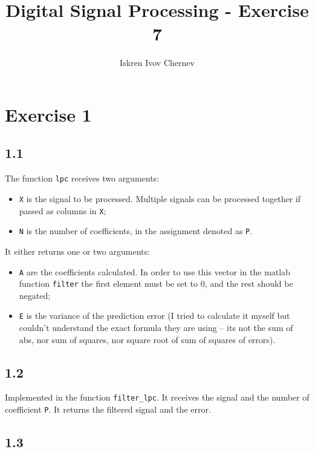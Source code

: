 \documentclass[a4paper]{article}
\newcommand{\TT}[1] {\texttt{#1}}
\begin{document}
\title{Digital Signal Processing - Exercise 7}
\author{Iskren Ivov Chernev}
\maketitle

\section*{Exercise 1}

\subsection*{1.1}

The function \TT{lpc} receives two arguments:
\begin{itemize}
  \item \TT{X} is the signal to be processed. Multiple signals can be processed
        together if passed as columns in \TT{X}; \\
  \item \TT{N} is the number of coefficients, in the assignment denoted as \TT{P}. \\
\end{itemize}

It either returns one or two arguments:
\begin{itemize}
  \item \TT{A} are the coefficients calculated. In order to use this vector in
  the matlab function \TT{filter} the first element must be set to $ 0 $, and
  the rest should be negated; \\
  \item \TT{E} is the variance of the prediction error (I tried to calculate it
  myself but couldn't understand the exact formula they are using -- its not
  the sum of abs, nor sum of squares, nor square root of sum of squares of
  errors). \\
\end{itemize}

\subsection*{1.2}

Implemented in the function \TT{filter\_lpc}. It receives the signal and the
number of coefficient \TT{P}. It returns the filtered signal and the error.

\subsection*{1.3}
\end{document}

